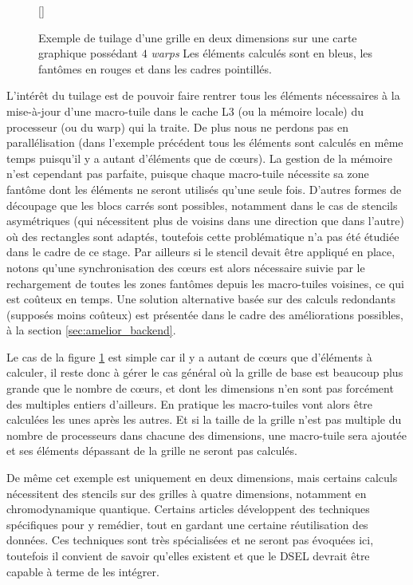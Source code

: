 \begin{figure}[!h]
[\FBwidth]
{\caption{Exemple de tuilage d'une grille en deux dimensions sur une carte graphique possédant $4$ \emph{warps} Les éléments calculés sont en bleus, les fantômes en rouges et dans les cadres pointillés.}\label{fig:stencil_mtile}}
{}
\end{figure}

L'intérêt du tuilage est de pouvoir faire rentrer tous les éléments nécessaires à la mise-à-jour d'une macro-tuile dans le cache L3 (ou la mémoire locale) du processeur (ou du warp) qui la traite. De plus nous ne perdons pas en parallélisation (dans l'exemple précédent tous les éléments sont calculés en même temps puisqu'il y a autant d'éléments que de cœurs). La gestion de la mémoire n'est cependant pas parfaite, puisque chaque macro-tuile nécessite sa zone fantôme dont les éléments ne seront utilisés qu'une seule fois. D'autres formes de découpage que les blocs carrés sont possibles, notamment dans le cas de stencils asymétriques (qui nécessitent plus de voisins dans une direction que dans l'autre) où des rectangles sont adaptés, toutefois cette problématique n'a pas été étudiée dans le cadre de ce stage. Par ailleurs si le stencil devait être appliqué en place, notons qu'une synchronisation des cœurs est alors nécessaire suivie par le rechargement de toutes les zones fantômes depuis les macro-tuiles voisines, ce qui est coûteux en temps. Une solution alternative basée sur des calculs redondants (supposés moins coûteux) est présentée dans le cadre des améliorations possibles, à la section \ref{sec:amelior_backend}.

Le cas de la figure \ref{fig:stencil_mtile} est simple car il y a autant de cœurs que d'éléments à calculer, il reste donc à gérer le cas général où la grille de base est beaucoup plus grande que le nombre de cœurs, et dont les dimensions n'en sont pas forcément des multiples entiers d'ailleurs. En pratique les macro-tuiles vont alors être calculées les unes après les autres. Et si la taille de la grille n'est pas multiple du nombre de processeurs dans chacune des dimensions, une macro-tuile sera ajoutée et ses éléments dépassant de la grille ne seront pas calculés. 

De même cet exemple est uniquement en deux dimensions, mais certains calculs nécessitent des stencils sur des grilles à quatre dimensions, notamment en chromodynamique quantique. Certains articles \cite{Art1,Art11} développent des techniques spécifiques pour y remédier, tout en gardant une certaine réutilisation des données. Ces techniques sont très spécialisées et ne seront pas évoquées ici, toutefois il convient de savoir qu'elles existent et que le DSEL devrait être capable à terme de les intégrer.

